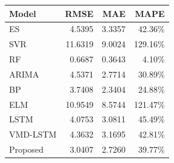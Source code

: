 {\tiny\setlength{\tabcolsep}{2pt}\begin{tabular}{lrrr} \toprule
Model & RMSE & MAE & MAPE \\ \midrule
ES & 4.5395 & 3.3357 & 42.36\% \\ 
SVR & 11.6319 & 9.0024 & 129.16\% \\ 
RF & 0.6687 & 0.3643 & 4.10\% \\ 
ARIMA & 4.5371 & 2.7714 & 30.89\% \\ 
BP & 3.7408 & 2.3404 & 24.88\% \\ 
ELM & 10.9549 & 8.5744 & 121.47\% \\ 
LSTM & 4.0753 & 3.0811 & 45.49\% \\ 
VMD-LSTM & 4.3632 & 3.1695 & 42.81\% \\ 
Proposed & 3.0407 & 2.7260 & 39.77\% \\ 
\bottomrule \end{tabular}}